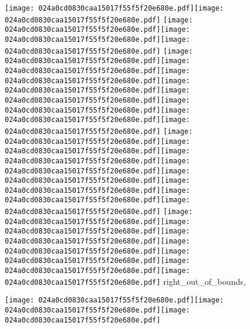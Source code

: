 \documentclass{article}
\newcommand{\origpg}[2]{\texttt{[image: 024a0cd0830caa15017f55f5f20e680e.pdf]}}
\begin{document}
{\fontsize{16.14pt}{19.368pt}\selectfont{}

\vspace*{-14.454pt}\hspace{35.438pt}\origpg9{120.74pt 773.51pt 128.83pt 789.65pt}\hspace{0.104pt}\origpg9{128.93pt 773.51pt 136.1pt 789.65pt} \origpg9{140.01pt 773.51pt 146.94pt 789.65pt}\origpg9{146.99pt 773.51pt 154.04pt 789.65pt}\hspace{-0.307pt}\origpg9{153.73pt 773.51pt 161.8pt 789.65pt} \origpg9{165.57pt 773.51pt 173.64pt 789.65pt}\hspace{-0.113pt}\origpg9{173.53pt 773.51pt 182.16pt 789.65pt}\origpg9{182.16pt 773.51pt 189.33pt 789.65pt}\hspace{-0.145pt}\origpg9{189.18pt 773.51pt 197.25pt 789.65pt}\origpg9{197.35pt 773.51pt 204.52pt 789.65pt}\origpg9{204.56pt 773.51pt 213.2pt 789.65pt}\origpg9{213.2pt 773.51pt 221.83pt 789.65pt}\origpg9{221.9pt 773.51pt 233.96pt 789.65pt} \origpg9{238.11pt 773.51pt 246.18pt 789.65pt}\hspace{-0.355pt}\origpg9{245.82pt 773.51pt 252.88pt 789.65pt}\hspace{-0.307pt}\origpg9{252.57pt 773.51pt 260.19pt 789.65pt}\origpg9{260.27pt 773.51pt 267.44pt 789.65pt}\hspace{-0.662pt}\origpg9{266.77pt 773.51pt 274.89pt 789.65pt}\origpg9{274.94pt 773.51pt 282.11pt 789.65pt}\origpg9{282.16pt 773.51pt 294.21pt 789.65pt}\hspace{-0.258pt}\origpg9{293.96pt 773.51pt 301.01pt 789.65pt} \origpg9{305.1pt 773.51pt 315.56pt 789.65pt}\hspace{-0.581pt}\origpg9{314.98pt 773.51pt 323.05pt 789.65pt}\hspace{-0.355pt}\origpg9{322.69pt 773.51pt 331.33pt 789.65pt}\origpg9{331.33pt 773.51pt 339.17pt 789.65pt}\hspace{0.129pt}\origpg9{339.3pt 773.51pt 347.94pt 789.65pt}\origpg9{347.94pt 773.51pt 356.57pt 789.65pt}\origpg9{356.64pt 773.51pt 365.27pt 789.65pt} {\fontsize{12pt}{14.4pt}\selectfont{}right\_{}out\_{}of\_{}bounds}{\fontsize{11.081pt}{13.298pt}\selectfont{}, }

 \origpg9{498.61pt 753.27pt 510.27pt 769.41pt}\origpg9{510.17pt 753.27pt 518.8pt 769.41pt}\origpg9{518.8pt 753.27pt 527.44pt 769.41pt} 

}
\end{document}
